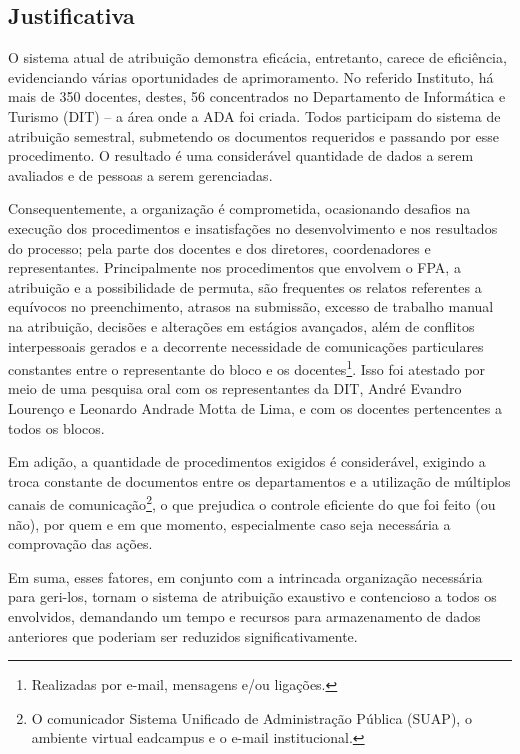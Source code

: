 \documentclass[12pt]{article}
\begin{document}
\subsection{Justificativa}
\par O sistema atual de atribuição demonstra eficácia, entretanto, carece de eficiência, evidenciando várias oportunidades de aprimoramento.
No referido Instituto, há mais de 350 docentes, destes, 56 concentrados no Departamento de Informática e Turismo (DIT) – a área onde a ADA foi criada. Todos participam do sistema de atribuição semestral, submetendo os documentos requeridos e passando por esse procedimento. O resultado é uma considerável quantidade de dados a serem avaliados e de pessoas a serem gerenciadas. 
\par Consequentemente, a organização é comprometida, ocasionando desafios na execução dos procedimentos e insatisfações no desenvolvimento e nos resultados do processo; pela parte dos docentes e dos diretores, coordenadores e representantes. Principalmente nos procedimentos que envolvem o FPA, a atribuição e a possibilidade de permuta, são frequentes os relatos referentes a equívocos no preenchimento, atrasos na submissão, excesso de trabalho manual na atribuição, decisões e alterações em estágios avançados, além de conflitos interpessoais gerados e a decorrente necessidade de comunicações particulares constantes entre o representante do bloco e os docentes\footnote{Realizadas por e-mail, mensagens e/ou ligações.}. Isso foi atestado por meio de uma pesquisa oral com os representantes da DIT, André Evandro Lourenço e Leonardo Andrade Motta de Lima, e com os docentes pertencentes a todos os blocos.
\par Em adição, a quantidade de procedimentos exigidos é considerável, exigindo a troca constante de documentos entre os departamentos e a utilização de múltiplos canais de comunicação\footnote{O comunicador Sistema Unificado de Administração Pública (SUAP), o ambiente virtual eadcampus e o e-mail institucional.}, o que prejudica o controle eficiente do que foi feito (ou não), por quem e em que momento, especialmente caso seja necessária a comprovação das ações.
\par Em suma, esses fatores, em conjunto com a intrincada organização necessária para geri-los, tornam o sistema de atribuição exaustivo e contencioso a todos os envolvidos, demandando um tempo e recursos para armazenamento de dados anteriores que poderiam ser reduzidos significativamente.
\end{document}
